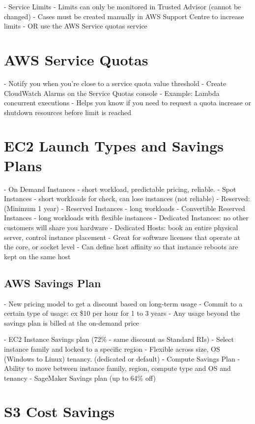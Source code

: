 \documentclass[11pt]{book}
\begin{document}
    - Service Limits
    - Limits can only be monitored in Trusted Advisor (cannot be changed)
    - Cases must be created manually in AWS Support Centre to increase limits
    - OR use the AWS Service quotas service


    \section{AWS Service Quotas}
    - Notify you when you're close to a service quota value threshold
    - Create CloudWatch Alarms on the Service Quotas console
    - Example: Lambda concurrent executions
    - Helps you know if you need to request a quota increase or shutdown resources before limit is reached


    \section{EC2 Launch Types and Savings Plans}
    - On Demand Instances - short workload, predictable pricing, reliable.
    - Spot Instances - short workloads for check, can lose instances (not reliable)
    - Reserved: (Minimum 1 year)
    - Reserved Instances - long workloads
    - Convertible Reserved Instances - long workloads with flexible instances
    - Dedicated Instances: no other customers will share you hardware
    - Dedicated Hosts: book an entire physical server, control instance placement
    - Great for software licenses that operate at the core, or socket level
    - Can define host affinity so that instance reboots are kept on the same host

    \subsection{AWS Savings Plan}
    - New pricing model to get a discount based on long-term usage
    - Commit to a certain type of usage: ex \$10 per hour for 1 to 3 years
    - Any usage beyond the savings plan is billed at the on-demand price

    - EC2 Instance Savings plan (72\% - same discount as Standard RIs)
    - Select instance family and locked to a specific region
    - Flexible across size, OS (Windows to Linux) tenancy. (dedicated or default)
    - Compute Savings Plan
    - Ability to move between instance family, region, compute type and OS and tenancy
    - SageMaker Savings plan (up to 64\% off)


    \section{S3 Cost Savings}
\end{document}
